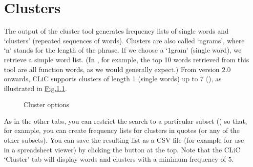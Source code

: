 \documentclass[letterpaper,10pt,english]{sphinxmanual}
\begin{document}
\chapter{Clusters}
\label{\detokenize{clicanalysis/clusters:clusters}}\label{\detokenize{clicanalysis/clusters:id1}}\label{\detokenize{clicanalysis/clusters::doc}}
\sphinxAtStartPar
The output of the cluster tool generates frequency lists of single words
and ‘clusters’ (repeated sequences of words). Clusters are also called
‘n\sphinxhyphen{}grams’, where ‘n’ stands for the length of the phrase. If we choose a
‘1\sphinxhyphen{}gram’ (single word), we retrieve a simple word list. (In , for example, the top 10 words retrieved from this tool are  \textendash{} all function words, as we would
generally expect.) From version 2.0 onwards, CLiC supports clusters of
length 1 (single words) up to 7 (), as
illustrated in \hyperref[\detokenize{clicanalysis/clusters:figure-analysis-clusters-ngrams}]{Fig.\@ \ref{\detokenize{clicanalysis/clusters:figure-analysis-clusters-ngrams}}}.

\begin{figure}[htbp]
\centering
\capstart

\noindent{}
\caption{Cluster options}\label{\detokenize{clicanalysis/clusters:id2}}\label{\detokenize{clicanalysis/clusters:figure-analysis-clusters-ngrams}}\end{figure}

\sphinxAtStartPar
As in the other tabs, you can restrict the search to a particular subset
() so that, for example, you can
create frequency lists for clusters in quotes (or any of the other
subsets). You can save the resulting list as a CSV file (for example for
use in a spreadsheet viewer) by clicking the  button at the
top. Note that the CLiC ‘Cluster’ tab will display words and clusters
with a minimum frequency of 5.

\sphinxstepscope
\end{document}
